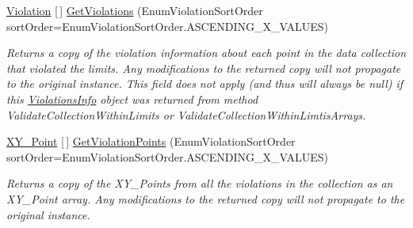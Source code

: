 \begin{DoxyCompactItemize}
\mbox{\hyperlink{class_c_s_i_1_1_library_1_1_array_utilities_1_1_array_limit_checks_1_1_violation}{Violation}} \mbox{[}$\,$\mbox{]} \mbox{\hyperlink{struct_c_s_i_1_1_library_1_1_array_utilities_1_1_array_limit_checks_1_1_violations_info_ad40e751c544e2881c9670d21b29ce011}{Get\+Violations}} (Enum\+Violation\+Sort\+Order sort\+Order=Enum\+Violation\+Sort\+Order.\+A\+S\+C\+E\+N\+D\+I\+N\+G\+\_\+\+X\+\_\+\+V\+A\+L\+U\+ES)
\begin{DoxyCompactList}\small\item\em Returns a copy of the violation information about each point in the data collection that violated the limits. Any modifications to the returned copy will not propagate to the original instance. This field does not apply (and thus will always be null) if this \mbox{\hyperlink{struct_c_s_i_1_1_library_1_1_array_utilities_1_1_array_limit_checks_1_1_violations_info}{Violations\+Info}} object was returned from method Validate\+Collection\+Within\+Limits or Validate\+Collection\+Within\+Limtis\+Arrays. \end{DoxyCompactList}\item 
\mbox{\hyperlink{struct_c_s_i_1_1_library_1_1_data_types_1_1_x_y___point}{X\+Y\+\_\+\+Point}} \mbox{[}$\,$\mbox{]} \mbox{\hyperlink{struct_c_s_i_1_1_library_1_1_array_utilities_1_1_array_limit_checks_1_1_violations_info_a42cc455336b98253d7ba015aa84d9d52}{Get\+Violation\+Points}} (Enum\+Violation\+Sort\+Order sort\+Order=Enum\+Violation\+Sort\+Order.\+A\+S\+C\+E\+N\+D\+I\+N\+G\+\_\+\+X\+\_\+\+V\+A\+L\+U\+ES)
\begin{DoxyCompactList}\small\item\em Returns a copy of the X\+Y\+\_\+\+Points from all the violations in the collection as an X\+Y\+\_\+\+Point array. Any modifications to the returned copy will not propagate to the original instance. \end{DoxyCompactList}\end{DoxyCompactItemize}
